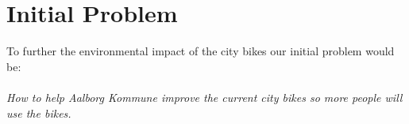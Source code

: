 \section*{Initial Problem}
To further the environmental impact of the city bikes our initial problem would be:\\\\
\textit{How to help Aalborg Kommune improve the current city bikes so more people will use the bikes.} 
